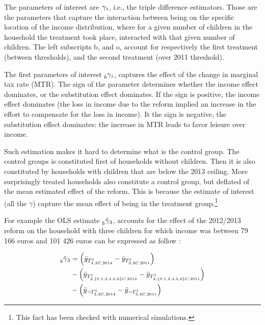   The parameters of interest are $\prescript{}{}\gamma_i $, i.e., the triple difference estimators. Those are the parameters that capture the interaction between being on the specific location of the income distribution, where for a given number of children in the household the treatment took place, interacted with that given number of children. The left subscripts b, and o, account for respectively the first treatment  (between thresholds), and the second treatment (over 2011 threshold).
  

  The first parameters of interest $\prescript{}{b}\gamma_i $, captures the effect of the change in marginal tax rate (MTR).  The sign of the parameter determines whether the income effect dominates, or the substitution effect dominates. If the sign is positive, the income effect dominates (the loss in income due to the reform implied an increase in the effort to compensate for the loss in income). It the sign is negative, the substitution effect dominates: the increase in MTR leads to favor leisure over income.


Such estimation makes it hard to determine what is the control group. The control groups is constituted first of households without children. Then it is also constituted by households with children that are below the 2013 ceiling. More surprisingly treated households also constitute a control group, but deflated of the mean estimated effect of the reform. This is because the estimate of interest (all the $\gamma$) capture the mean effect of being in the treatment group.\footnote{This fact has been checked with numerical simulations. }






For example the OLS estimate $\hat{\prescript{}{b}\gamma_3} $, accounts for the effect of the 2012/2013 reform on the household with three children for which income was between 79 166 euros and 101 426 euros can be expressed as follow : 

\begin{align}
\begin{split}
\hat{\prescript{}{b}\gamma_3}  &= \left( \bar{y}_{T^1_{3, 3C, 2014}} - \bar{y}_{T^1_{3, 3C, 2011}} \right) \\
&- \left( \bar{y}_{T^1_{3, \{0,1,2,4,5,6 \}C, 2014}} - \bar{y}_{T^1_{3, \{0,1,2,4,5,6 \}C, 2011}} \right) \\
& - \left( \bar{y}_{\neg T^1_{3, 3C, 2014}} - \bar{y}_{\neg T^1_{3, 3C, 2011}} \right) 
\end{split}
\end{align}

